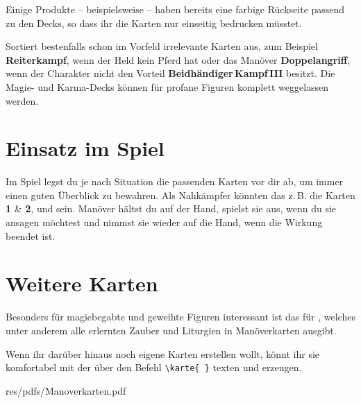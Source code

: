 \documentclass[openright]{Ilaris}
\begin{document}
Einige Produkte -- beispielsweise  -- haben bereits eine farbige Rückseite passend zu den Decks, so dass ihr die Karten nur einseitig bedrucken müsstet.

Sortiert bestenfalls schon im Vorfeld irrelevante Karten aus, zum Beispiel \textbf{Reiterkampf}, wenn der Held kein Pferd hat
oder das Manöver \textbf{Doppelangriff},
wenn der Charakter nicht den Vorteil \textbf{Beidhändiger\,Kampf\,III} besitzt.
Die Magie- und Karma-Decks können für profane Figuren komplett weggelassen werden.


\section*{Einsatz im Spiel}
Im Spiel legst du je nach Situation die passenden Karten vor dir ab, um immer einen guten Überblick zu bewahren.
Als Nahkämpfer könnten das z.\,B. die Karten  \textbf{1} \& \textbf{2},  und  sein.
Manöver hältst du auf der Hand, spielst sie aus, wenn du sie ansagen möchtest und nimmst sie wieder auf die Hand, wenn die Wirkung beendet ist.

\section*{Weitere Karten}
Besonders für magiebegabte und geweihte Figuren interessant ist das  für ,
welches unter anderem alle erlernten Zauber und Liturgien in Manöverkarten ausgibt.

Wenn ihr darüber hinaus noch eigene Karten erstellen wollt,
könnt ihr sie komfortabel mit der  über den Befehl \verb|\karte{ }| texten und erzeugen.
\spaltenende

%
	{res/pdfs/Manoverkarten.pdf}



\end{document}
